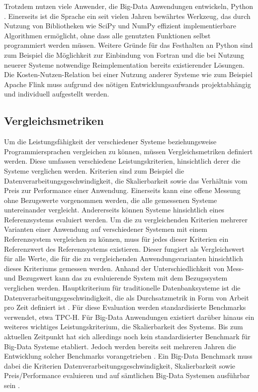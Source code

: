 Trotzdem nutzen viele Anwender, die Big-Data Anwendungen entwickeln, Python \cite{Millman2011}. Einerseits ist die Sprache ein seit vielen Jahren bewährtes Werkzeug, das durch Nutzung von Bibliotheken wie SciPy und NumPy effizient implementierbare Algorithmen ermöglicht, ohne dass alle genutzten Funktionen selbst programmiert werden müssen. Weitere Gründe für das Festhalten an Python sind zum Beispiel die Möglichkeit zur Einbindung von Fortran und die bei Nutzung neuerer Systeme notwendige Reimplementation bereits existierender Lösungen. Die Kosten-Nutzen-Relation bei einer Nutzung anderer Systeme wie zum Beispiel Apache Flink muss aufgrund des nötigen Entwicklungsaufwands projektabhängig und individuell aufgestellt werden. 

\subsection{Vergleichsmetriken}
\label{sec:Vergleichsmetriken}
Um die Leistungsfähigkeit der verschiedener Systeme beziehungsweise Programmiersprachen vergleichen zu können, müssen Vergleichsmetriken definiert werden. Diese umfassen verschiedene Leistungskriterien, hinsichtlich derer die Systeme verglichen werden. Kriterien sind zum Beispiel die Datenverarbeitungsgeschwindigkeit, die Skalierbarkeit sowie das Verhältnis vom Preis zur Performance einer Anwendung. Einerseits kann eine offene Messung ohne Bezugswerte vorgenommen werden, die alle gemessenen Systeme untereinander vergleicht. Andererseits können Systeme hinsichtlich eines Referenzsystems evaluiert werden. Um die zu vergleichenden Kriterien mehrerer Varianten einer Anwendung auf verschiedener Systemen mit einem Referenzsystem vergleichen zu können, muss für jedes dieser Kriterien ein Referenzwert des Referenzsystems existieren. Dieser fungiert als Vergleichswert für alle Werte, die für die zu vergleichenden Anwendungsvarianten hinsichtlich dieses Kriteriums gemessen werden. Anhand der Unterschiedlichkeit von Mess- und Bezugswert kann das zu evaluierende System mit dem Bezugssystem verglichen werden. Hauptkriterium für traditionelle Datenbanksysteme ist die Datenverarbeitungsgeschwindigkeit, die als Durchsatzmetrik in Form von Arbeit pro Zeit definiert ist \cite{Gray1992}. Für diese Evaluation werden standardisierte Benchmarks verwendet, etwa TPC-H. Für Big-Data Anwendungen existiert darüber hinaus ein weiteres wichtiges Leistungskriterium, die Skalierbarkeit des Systems. Bis zum aktuellen Zeitpunkt hat sich allerdings noch kein standardisierter Benchmark für Big-Data Systeme etabliert. Jedoch werden bereits seit mehreren Jahren die Entwicklung solcher Benchmarks vorangetrieben \cite{Chen2014}. Ein Big-Data Benchmark muss dabei die Kriterien Datenverarbeitungsgeschwindigkeit, Skalierbarkeit sowie Preis/Performance evaluieren und auf sämtlichen Big-Data Systemen ausführbar sein \cite{Baru2013}.

